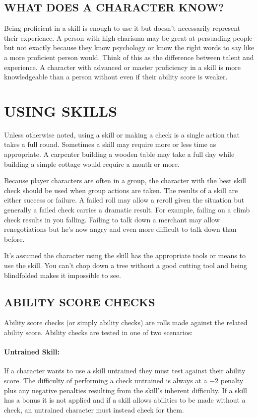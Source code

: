 \begin{multicols}{2}
\subsection{WHAT DOES A CHARACTER KNOW?}

Being proficient in a skill is enough to use it but doesn't necessarily represent their experience.  A person with high charisma may be great at persuading people but not exactly because they know psychology or know the right words to say like a more proficient person would.  Think of this as the difference between talent and experience.  A character with advanced or master proficiency in a skill is more knowledgeable than a person without even if their ability score is weaker.  

\section{USING SKILLS}

Unless otherwise noted, using a skill or making a check is a single action that takes a full round.  Sometimes a skill may require more or less time as appropriate. A carpenter building a wooden table may take a full day while building a simple cottage would require a month or more.  

Because player characters are often in a group, the character with the best skill check should be used when group actions are taken.  The results of a skill are either success or failure.  A failed roll may allow a reroll given the situation but generally a failed check carries a dramatic result.  For example, failing on a climb check results in you falling.  Failing to talk down a merchant may allow renegotiations but he's now angry and even more difficult to talk down than before.  

It's assumed the character using the skill has the appropriate tools or means to use the skill.  You can't chop down a tree without a good cutting tool and being blindfolded makes it impossible to see.

\subsection{ABILITY SCORE CHECKS}

Ability score checks (or simply ability checks) are rolls made against the related ability score.  Ability checks are tested in one of two scenarios:

\paragraph{Untrained Skill:} If a character wants to use a skill untrained they must test against their ability score.  The difficulty of performing a check untrained is always at a $-2$ penalty plus any negative penalties resulting from the skill's inherent difficulty.  If a skill has a bonus it is not applied and if a skill allows abilities to be made without a check, an untrained character must instead check for them.


\end{multicols}
